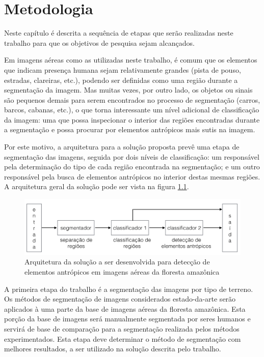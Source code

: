 \chapter{Metodologia}\label{cap:metodologia}

Neste capítulo é descrita a sequência de etapas que serão realizadas neste trabalho para que os objetivos de pesquisa sejam alcançados.

Em imagens aéreas como as utilizadas neste trabalho, é comum que os elementos que indicam presença humana sejam relativamente grandes (pista de pouso, estradas, clareiras, etc.), podendo ser definidas como uma região durante a segmentação da imagem. Mas muitas vezes, por outro lado, os objetos ou sinais são pequenos demais para serem encontrados no processo de segmentação (carros, barcos, cabanas, etc.), o que torna interessante um nível adicional de classificação da imagem: uma que possa inspecionar o interior das regiões encontradas durante a segmentação e possa procurar por elementos antrópicos mais sutis na imagem.

Por este motivo, a arquitetura para a solução proposta prevê uma etapa de segmentação das imagens, seguida por dois níveis de classificação: um responsável pela determinação do tipo de cada região encontrada na segmentação; e um outro responsável pela busca de elementos antrópicos no interior destas mesmas regiões. A arquitetura geral da solução pode ser vista na figura \ref{fig:metDiagrama}.

\begin{figure}[h]
    \includegraphics[width=\textwidth]{imgs/arquitetura}
    \caption{Arquitetura da solução a ser desenvolvida para detecção de elementos antrópicos em imagens aéreas da floresta amazônica}
    \label{fig:metDiagrama}
\end{figure}

A primeira etapa do trabalho é a segmentação das imagens por tipo de terreno. Os métodos de segmentação de imagens considerados estado-da-arte serão aplicados à uma parte da base de imagens aéreas da floresta amazônica. Esta porção da base de imagens será manualmente segmentada por seres humanos e servirá de base de comparação para a segmentação realizada pelos métodos experimentados. Esta etapa deve determinar o método de segmentação com melhores resultados, a ser utilizado na solução descrita pelo trabalho.

